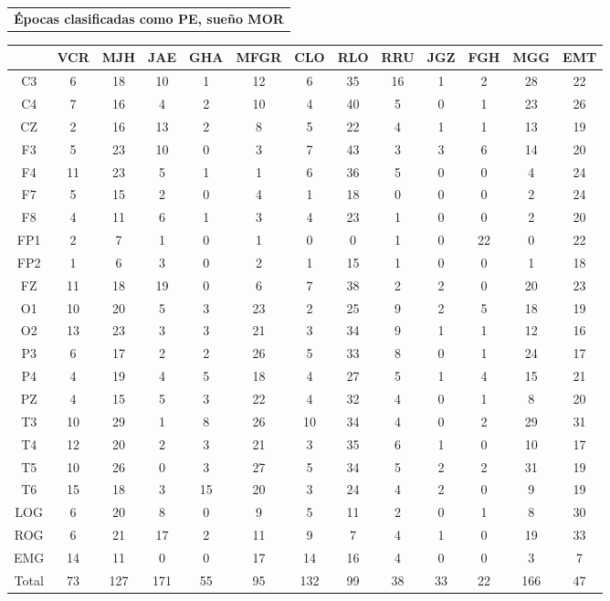\documentclass[12pt,a4paper]{mitthesis}
\begin{document}
\begin{SidewaysFigure}
\centering
\begin{tabular}{c}
\textbf{\'Epocas clasificadas como PE, sue\~no MOR}
\vspace{1em}
\end{tabular}
\begin{tabular}{c|ccccc|cccc|ccc}
& VCR & MJH & JAE & GHA & MFGR
& CLO & RLO & RRU & JGZ
& FGH & MGG & EMT \\
\hline
C3&6&18&10&1&12&6&35&16&1&2&28&22 \\
C4&7&16&4&2&10&4&40&5&0&1&23&26 \\
CZ&2&16&13&2&8&5&22&4&1&1&13&19 \\
F3&5&23&10&0&3&7&43&3&3&6&14&20 \\
F4&11&23&5&1&1&6&36&5&0&0&4&24 \\
F7&5&15&2&0&4&1&18&0&0&0&2&24 \\
F8&4&11&6&1&3&4&23&1&0&0&2&20 \\
FP1&2&7&1&0&1&0&0&1&0&22&0&22 \\
FP2&1&6&3&0&2&1&15&1&0&0&1&18 \\
FZ&11&18&19&0&6&7&38&2&2&0&20&23 \\
O1&10&20&5&3&23&2&25&9&2&5&18&19 \\
O2&13&23&3&3&21&3&34&9&1&1&12&16 \\
P3&6&17&2&2&26&5&33&8&0&1&24&17 \\
P4&4&19&4&5&18&4&27&5&1&4&15&21 \\
PZ&4&15&5&3&22&4&32&4&0&1&8&20 \\
T3&10&29&1&8&26&10&34&4&0&2&29&31 \\
T4&12&20&2&3&21&3&35&6&1&0&10&17 \\
T5&10&26&0&3&27&5&34&5&2&2&31&19 \\
T6&15&18&3&15&20&3&24&4&2&0&9&19 \\
LOG&6&20&8&0&9&5&11&2&0&1&8&30 \\
ROG&6&21&17&2&11&9&7&4&1&0&19&33 \\
EMG&14&11&0&0&17&14&16&4&0&0&3&7 \\
\hline
Total&73&127&171&55&95&132&99&38&33&22&166&47
\end{tabular}
\caption{Total de \'epocas PE clasificadas como sue\~no MOR (fase R) para cada canal. En la 
\'ultima fila se reporta el n\'umero total de \'epocas clasificadas como sue\~no MOR para cada 
sujeto (en todos los canales se registr\'o la misma cantidad de \'epocas).
}
\label{total_gpos_mor}
\end{SidewaysFigure}
\end{document}
